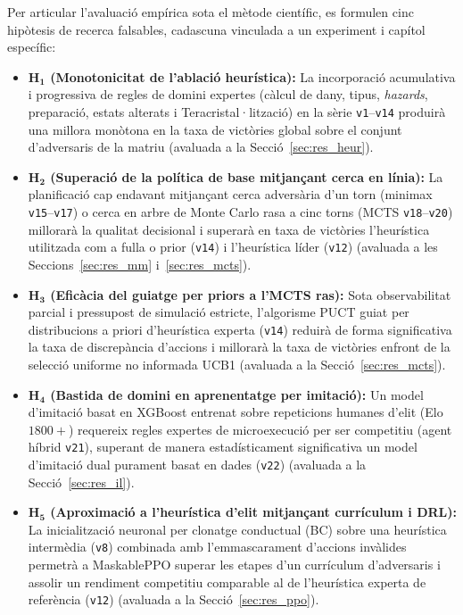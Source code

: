 Per articular l'avaluació empírica sota el mètode científic, es formulen cinc hipòtesis de recerca falsables, cadascuna vinculada a un experiment i capítol específic:
\begin{itemize}
    \item \textbf{$\mathbf{H_1}$ (Monotonicitat de l'ablació heurística):} La incorporació acumulativa i progressiva de regles de domini expertes (càlcul de dany, tipus, \emph{hazards}, preparació, estats alterats i Teracristal·lització) en la sèrie \texttt{v1}--\texttt{v14} produirà una millora monòtona en la taxa de victòries global sobre el conjunt d'adversaris de la matriu (avaluada a la Secció~\ref{sec:res_heur}).
    \item \textbf{$\mathbf{H_2}$ (Superació de la política de base mitjançant cerca en línia):} La planificació cap endavant mitjançant cerca adversària d'un torn (minimax \texttt{v15}--\texttt{v17}) o cerca en arbre de Monte Carlo rasa a cinc torns (MCTS \texttt{v18}--\texttt{v20}) millorarà la qualitat decisional i superarà en taxa de victòries l'heurística utilitzada com a fulla o prior (\texttt{v14}) i l'heurística líder (\texttt{v12}) (avaluada a les Seccions~\ref{sec:res_mm} i~\ref{sec:res_mcts}).
    \item \textbf{$\mathbf{H_3}$ (Eficàcia del guiatge per priors a l'MCTS ras):} Sota observabilitat parcial i pressupost de simulació estricte, l'algorisme PUCT guiat per distribucions a priori d'heurística experta (\texttt{v14}) reduirà de forma significativa la taxa de discrepància d'accions i millorarà la taxa de victòries enfront de la selecció uniforme no informada UCB1 (avaluada a la Secció~\ref{sec:res_mcts}).
    \item \textbf{$\mathbf{H_4}$ (Bastida de domini en aprenentatge per imitació):} Un model d'imitació basat en XGBoost entrenat sobre repeticions humanes d'elit (Elo~$1800+$) requereix regles expertes de microexecució per ser competitiu (agent híbrid \texttt{v21}), superant de manera estadísticament significativa un model d'imitació dual purament basat en dades (\texttt{v22}) (avaluada a la Secció~\ref{sec:res_il}).
    \item \textbf{$\mathbf{H_5}$ (Aproximació a l'heurística d'elit mitjançant currículum i DRL):} La inicialització neuronal per clonatge conductual (BC) sobre una heurística intermèdia (\texttt{v8}) combinada amb l'emmascarament d'accions invàlides permetrà a MaskablePPO superar les etapes d'un currículum d'adversaris i assolir un rendiment competitiu comparable al de l'heurística experta de referència (\texttt{v12}) (avaluada a la Secció~\ref{sec:res_ppo}).
\end{itemize}

